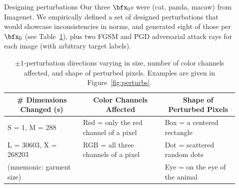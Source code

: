 \documentclass[final,notheorems]{beamer}
\newlength{\sepwidth}
\newlength{\colwidth}
\newcommand{\separatorcolumn}{\begin{column}{\sepwidth}\end{column}}
\begin{document}
\begin{frame}[t]
\begin{columns}[t]
\begin{column}{\colwidth}
    \begin{block}{Designing perturbations}
    Our three $\bfx_0$s were (cat, panda, macaw) from Imagenet. We empirically defined a set of designed perturbations that would showcase inconsistencies in norms, and generated eight of those per $\bfx_0$ (see Table~\ref{tab:rays}), plus two FGSM and PGD adversarial attack rays for each image (with arbitrary target labels).
    \begin{table}
        \centering
          \begin{small}
            \begin{tabular}{l|l|l}
              \multicolumn{1}{c|}{\textbf{\# Dimensions Changed (s)}} & \multicolumn{1}{c|}{\textbf{Color Channels Affected}} & \multicolumn{1}{c}{\textbf{Shape of Perturbed Pixels}} \\\hline
              S = 1, M = 288 & Red = only the red channel of a pixel & Box = a centered rectangle \\
              L = 30603, X = 268203 & RGB = all three channels of a pixel & Dot = scattered random dots \\
              (mnemonic: garment size) & & Eye = on the eye of the animal \\
            \end{tabular}
          \end{small}
        \caption{$\pm1$-perturbation directions varying in size, number of color channels affected, and shape of perturbed pixels. Examples are given in Figure~\ref{fig:perturbs}.}
        \label{tab:rays}
    \end{table}

  \end{block}
\end{column}

\separatorcolumn

\begin{column}{\colwidth}


\end{column}
\end{columns}
\end{frame}
\end{document}
